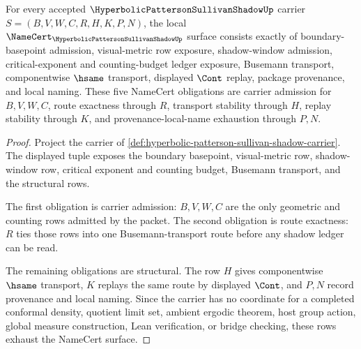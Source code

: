\begin{theorem}
\label{thm:hyperbolic-patterson-sullivan-shadow-namecert-obligations}
For every accepted $\HyperbolicPattersonSullivanShadowUp$ carrier $S=(B,V,W,C,R,H,K,P,N)$, the local $\NameCert_{\HyperbolicPattersonSullivanShadowUp}$ surface consists exactly of boundary-basepoint admission, visual-metric row exposure, shadow-window admission, critical-exponent and counting-budget ledger exposure, Busemann transport, componentwise $\hsame$ transport, displayed $\Cont$ replay, package provenance, and local naming. These five NameCert obligations are carrier admission for $B,V,W,C$, route exactness through $R$, transport stability through $H$, replay stability through $K$, and provenance-local-name exhaustion through $P,N$.
\end{theorem}
\begin{proof}
Project the carrier of \autoref{def:hyperbolic-patterson-sullivan-shadow-carrier}. The displayed tuple exposes the boundary basepoint, visual-metric row, shadow-window row, critical exponent and counting budget, Busemann transport, and the structural rows.

The first obligation is carrier admission: $B,V,W,C$ are the only geometric and counting rows admitted by the packet. The second obligation is route exactness: $R$ ties those rows into one Busemann-transport route before any shadow ledger can be read.

The remaining obligations are structural. The row $H$ gives componentwise $\hsame$ transport, $K$ replays the same route by displayed $\Cont$, and $P,N$ record provenance and local naming. Since the carrier has no coordinate for a completed conformal density, quotient limit set, ambient ergodic theorem, host group action, global measure construction, Lean verification, or bridge checking, these rows exhaust the NameCert surface.
\end{proof}



